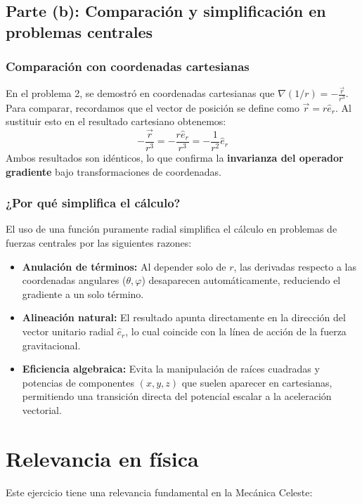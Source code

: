 \documentclass[a4paper]{article}
\begin{document}
\subsection{Parte (b): Comparación y simplificación en problemas centrales}

\subsubsection{Comparación con coordenadas cartesianas}
En el problema 2, se demostró en coordenadas cartesianas que $\nabla (1/r) = -\frac{\vec{r}}{r^3}$. 
Para comparar, recordamos que el vector de posición se define como $\vec{r} = r \hat{e}_r$. Al sustituir esto en el resultado cartesiano obtenemos:
$$ -\frac{\vec{r}}{r^3} = -\frac{r \hat{e}_r}{r^3} = -\frac{1}{r^2} \hat{e}_r $$
Ambos resultados son idénticos, lo que confirma la \textbf{invarianza del operador gradiente} bajo transformaciones de coordenadas.

\subsubsection{¿Por qué simplifica el cálculo?}
El uso de una función puramente radial simplifica el cálculo en problemas de fuerzas centrales por las siguientes razones:
\begin{itemize}
    \item \textbf{Anulación de términos:} Al depender solo de $r$, las derivadas respecto a las coordenadas angulares ($\theta, \varphi$) desaparecen automáticamente, reduciendo el gradiente a un solo término.
    \item \textbf{Alineación natural:} El resultado apunta directamente en la dirección del vector unitario radial $\hat{e}_r$, lo cual coincide con la línea de acción de la fuerza gravitacional.
    \item \textbf{Eficiencia algebraica:} Evita la manipulación de raíces cuadradas y potencias de componentes $(x, y, z)$ que suelen aparecer en cartesianas, permitiendo una transición directa del potencial escalar a la aceleración vectorial.
\end{itemize}

\section*{Relevancia en física}

Este ejercicio tiene una relevancia fundamental en la {Mecánica Celeste}:
\end{document}
